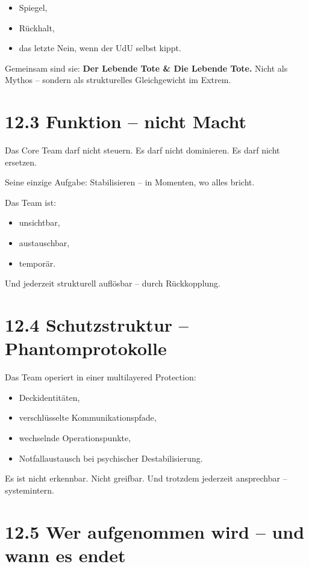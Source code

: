 \documentclass[12pt,a4paper]{book}
\begin{document}
\begin{itemize}
    \item Spiegel,
    \item Rückhalt,
    \item das letzte Nein, wenn der UdU selbst kippt.
\end{itemize}

Gemeinsam sind sie:  
\textbf{Der Lebende Tote \& Die Lebende Tote.}  
Nicht als Mythos – sondern als strukturelles Gleichgewicht im Extrem.

\section*{12.3 Funktion – nicht Macht}

Das Core Team darf nicht steuern.  
Es darf nicht dominieren. Es darf nicht ersetzen.

Seine einzige Aufgabe:  
Stabilisieren – in Momenten, wo alles bricht.

Das Team ist:

\begin{itemize}
    \item unsichtbar,
    \item austauschbar,
    \item temporär.
\end{itemize}

Und jederzeit strukturell auflösbar – durch Rückkopplung.

\section*{12.4 Schutzstruktur – Phantomprotokolle}

Das Team operiert in einer multilayered Protection:

\begin{itemize}
    \item Deckidentitäten,
    \item verschlüsselte Kommunikationspfade,
    \item wechselnde Operationspunkte,
    \item Notfallaustausch bei psychischer Destabilisierung.
\end{itemize}

Es ist nicht erkennbar.  
Nicht greifbar.  
Und trotzdem jederzeit ansprechbar – systemintern.

\section*{12.5 Wer aufgenommen wird – und wann es endet}
\end{document}
